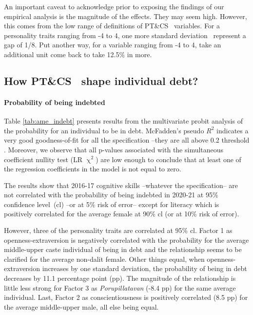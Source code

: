 \documentclass[a4paper, 12pt, onecolumn]{article}
\newcommand{\sd}{standard deviation}
\newcommand{\aebe}{all else being equal}
\newcommand{\Ote}{Other things equal}
\newcommand{\cl}{confidence level}
\newcommand{\PTCS}{PT\&CS}
\begin{document}
An important caveat to acknowledge prior to exposing the findings of our empirical analysis is the magnitude of the effects.
They may seem high. 
However, this comes from the low range of definitions of \PTCS~ variables.
For a personality traits ranging from -4 to 4, one more \sd~ represent a gap of 1/8.
Put another way, for a variable ranging from -4 to 4, take an additional unit come back to take 12.5\% in more.


	\subsection{How \PTCS~ shape individual debt?}

\paragraph{Probability of being indebted}
Table \ref{tab:ame_indebt} presents results from the multivariate probit analysis of the probability for an individual to be in debt.
McFadden's pseudo $R^2$ indicates a very good goodness-of-fit for all the specification --they are all above 0.2 threshold \citep{McFadden1979}.
Moreover, we observe that all p-values associated with the simultaneous coefficient nullity test (LR $\upchi^2$) are low enough to conclude that at least one of the regression coefficients in the model is not equal to zero.

The results show that 2016-17 cognitive skills --whatever the specification-- are not correlated with the probability of being indebted in 2020-21 at 95\% \cl~(cl) --or at 5\% risk of error-- except for literacy which is positively correlated for the average female at 90\% cl (or at 10\% risk of error).

However, three of the personality traits are correlated at 95\% cl. 
Factor 1 as openness-extraversion is negatively correlated with the probability for the average middle-upper caste individual of being in debt and the relationship seems to be clarified for the average non-dalit female.
\Ote, when openness-extraversion increases by one \sd, the probability of being in debt decreases by 11.1 percentage point (pp).
The magnitude of the relationship is little less strong for Factor 3 as \textit{Porupillatavan} (-8.4 pp) for the same average individual. 
Last, Factor 2 as conscientiousness is positively correlated (8.5 pp) for the average middle-upper male, \aebe.
\end{document}
